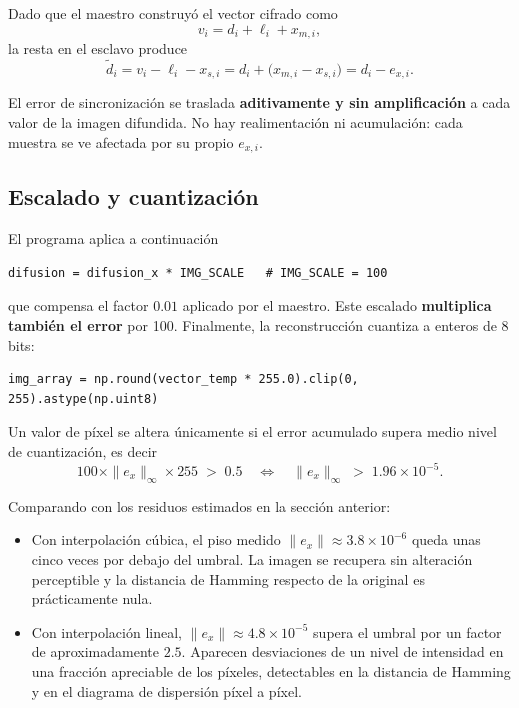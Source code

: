 \documentclass[12pt,a4paper]{article}
\begin{document}
Dado que el maestro construyó el vector cifrado como
\begin{equation}
v_i = d_i + \ell_i + x_{m,i},
\end{equation}
la resta en el esclavo produce
\begin{equation}
\tilde{d}_i = v_i - \ell_i - x_{s,i} = d_i + \bigl(x_{m,i} - x_{s,i}\bigr) = d_i - e_{x,i}.
\end{equation}

El error de sincronización se traslada \textbf{aditivamente y sin amplificación} a cada valor de la imagen difundida. No hay realimentación ni acumulación: cada muestra se ve afectada por su propio $e_{x,i}$.

\subsection{Escalado y cuantización}

El programa aplica a continuación
\begin{lstlisting}
difusion = difusion_x * IMG_SCALE   # IMG_SCALE = 100
\end{lstlisting}
que compensa el factor $0.01$ aplicado por el maestro. Este escalado \textbf{multiplica también el error} por 100. Finalmente, la reconstrucción cuantiza a enteros de 8 bits:
\begin{lstlisting}
img_array = np.round(vector_temp * 255.0).clip(0, 255).astype(np.uint8)
\end{lstlisting}

Un valor de píxel se altera únicamente si el error acumulado supera medio nivel de cuantización, es decir
\begin{equation}
100 \times \|e_x\|_{\infty} \times 255 \;>\; 0.5
\quad \Longleftrightarrow \quad
\|e_x\|_{\infty} \;>\; 1.96 \times 10^{-5}.
\end{equation}

Comparando con los residuos estimados en la sección anterior:

\begin{itemize}[leftmargin=1.4cm]
	\item Con interpolación cúbica, el piso medido $\|e_x\| \approx 3.8 \times 10^{-6}$ queda unas cinco veces por debajo del umbral. La imagen se recupera sin alteración perceptible y la distancia de Hamming respecto de la original es prácticamente nula.
	\item Con interpolación lineal, $\|e_x\| \approx 4.8 \times 10^{-5}$ supera el umbral por un factor de aproximadamente $2.5$. Aparecen desviaciones de un nivel de intensidad en una fracción apreciable de los píxeles, detectables en la distancia de Hamming y en el diagrama de dispersión píxel a píxel.
\end{itemize}
\end{document}
